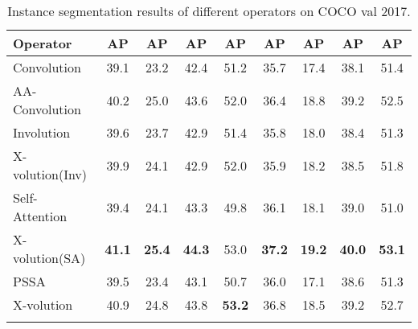 \documentclass{article}
\newcommand{\cgap}[2]{
	\fontsize{6pt}{1em}\selectfont{({#2})}
}
\newcommand{\apbbox}[1]{AP}
\newcommand{\apmask}[1]{AP}
\begin{document}
\begin{table*}[t]\centering
\caption{Instance segmentation results of different operators on COCO val 2017.}
 \begin{spacing}{1.3}
 \small
\setlength\tabcolsep{0.9pt}
 \begin{tabular}{l|c|c|c|c|c|c|c|c}
        \Xhline{1.1pt}
		Operator
		& \fontsize{7pt}{1em}\selectfont \quad\apbbox{~}
		& \fontsize{7pt}{1em}\selectfont \quad\apbbox{S}
		& \fontsize{7pt}{1em}\selectfont \quad\apbbox{M}
		& \fontsize{7pt}{1em}\selectfont \quad\apbbox{L}
		& \fontsize{7pt}{1em}\selectfont \quad\apmask{~}
		& \fontsize{7pt}{1em}\selectfont \quad\apmask{S}
		& \fontsize{7pt}{1em}\selectfont \quad\apmask{M}
		& \fontsize{7pt}{1em}\selectfont \quad\apmask{L}\\ \hline
        
        Convolution &39.1 & 23.2 & 42.4 & 51.2 & 35.7 & 17.4 & 38.1 & 51.4 \\
		AA-Convolution~\cite{DBLP:conf/iccv/BelloZLVS19}
		& 40.2\cgap{+}{1.1} & 25.0\cgap{+}{1.8} & 43.6\cgap{+}{1.2} & 52.0\cgap{+}{0.8} & 36.4\cgap{+}{0.7} & 18.8\cgap{+}{1.4} & 39.2\cgap{+}{1.1} & 52.5\cgap{+}{1.1} \\
		\cline{1-9}
		

		Involution~\cite{DBLP:journals/corr/abs-2103-06255}
		& 39.6\cgap{+}{0.5} & 23.7\cgap{+}{0.5} & 42.9\cgap{+}{0.5} & 51.4\cgap{+}{0.2} & 35.8\cgap{+}{0.1} & 18.0\cgap{+}{0.6} & 38.4\cgap{+}{0.3} & 51.3\cgap{-}{0.1} \\
		X-volution(Inv) &  39.9\cgap{+}{0.8} & 24.1\cgap{+}{0.9} & 42.9\cgap{+}{0.5} & 52.0\cgap{+}{0.8} & 35.9\cgap{+}{0.2} & 18.2\cgap{+}{0.8} & 38.5\cgap{+}{0.4} & 51.8\cgap{+}{0.4}\\
		\cline{1-9}
		   
		Self-Attention~\cite{DBLP:conf/nips/VaswaniSPUJGKP17}
		& 39.4\cgap{+}{0.3} & 24.1\cgap{+}{0.9} & 43.3\cgap{+}{0.9} & 49.8\cgap{-}{1.4} & 36.1\cgap{+}{0.4} & 18.1\cgap{+}{0.7} & 39.0\cgap{+}{0.9} & 51.0\cgap{-}{0.4} \\
		X-volution(SA) & \textbf{41.1}\cgap{+}{2.0} & \textbf{25.4}\cgap{+}{2.2} & \textbf{44.3}\cgap{+}{1.9} & 53.0\cgap{+}{1.8} & \textbf{37.2}\cgap{+}{1.5} & \textbf{19.2}\cgap{+}{1.8} & \textbf{40.0}\cgap{+}{1.9} & \textbf{53.1}\cgap{+}{1.7}\\ 
		\cline{1-9}
	
		PSSA & 39.5\cgap{+}{0.4} & 23.4\cgap{+}{0.2} & 43.1\cgap{+}{0.7} & 50.7\cgap{-}{0.5} & 36.0\cgap{+}{0.3} & 17.1\cgap{-}{0.3} & 38.6\cgap{+}{0.5} & 51.3\cgap{-}{0.1}\\
		X-volution &  40.9\cgap{+}{1.8} & 24.8\cgap{+}{1.6} & 43.8\cgap{+}{1.4} & \textbf{53.2}\cgap{+}{2.0} & 36.8\cgap{+}{1.1} & 18.5\cgap{+}{1.1} & 39.2\cgap{+}{1.1} & 52.7\cgap{+}{1.3} \\

		\Xhline{1.0pt}

\end{tabular}
\label{tab_seg}
\end{spacing}
\end{table*}
\end{document}
